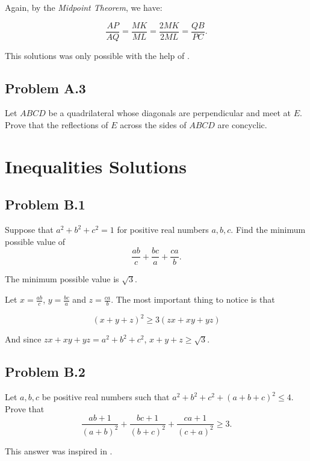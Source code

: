 \documentclass[12pt]{article}
\newcommand{\cmark}{\textcolor{color5}{\ding{51}}} %
\newcommand{\xmark}{\textcolor{color6}{\ding{55}}}   %
\begin{document}
      Again, by the \textit{Midpoint Theorem}, we have:

      \[
        \frac{AP}{AQ} = \frac{MK}{ML} = \frac{2MK}{2ML} = \frac{QB}{PC}.
      \]

      This solutions was only possible with the help of \cite{evan3}.
    \clearpage

    \subsection{Problem A.3 \xmark}
      \begin{tcolorbox}[problembox]
        Let $ABCD$ be a quadrilateral whose diagonals are perpendicular and meet at $E$. Prove that the reflections
        of $E$ across the sides of $ABCD$ are concyclic.
      \end{tcolorbox}

  \clearpage

  \section{\textsf{Inequalities Solutions}}
    \subsection{Problem B.1 \cmark}
      \begin{tcolorbox}[problembox]
         Suppose that $a^2 + b^2 + c^2 = 1$ for positive real numbers $a, b, c$. Find the minimum possible value of
          \[
            \frac{ab}{c} + \frac{bc}{a} + \frac{ca}{b}.
          \]
      \end{tcolorbox}

      The minimum possible value is $\sqrt{3}$.

      Let $x=\frac{ab}{c}$, $y=\frac{bc}{a}$ and $z=\frac{ca}{b}$.
      The most important thing to notice is that

      \[
        (x+y+z)^2 \ge 3(zx + xy + yz)
      \]

      And since $zx + xy + yz = a^2 + b^2 + c^2$, $x + y + z \ge \sqrt{3}$.
    \clearpage

    \subsection{Problem B.2 \cmark}
      \begin{tcolorbox}[problembox]
         Let $a, b, c$ be positive real numbers such that $a^2 + b^2 + c^2 + (a+b+c)^2 \le 4$. Prove that
          \[
            \frac{ab + 1}{(a+b)^2} + \frac{bc + 1}{(b+c)^2} + \frac{ca + 1}{(c+a)^2} \ge 3.
          \]
      \end{tcolorbox}
      This answer was inspired in \cite{evan2}.
      
\end{document}
